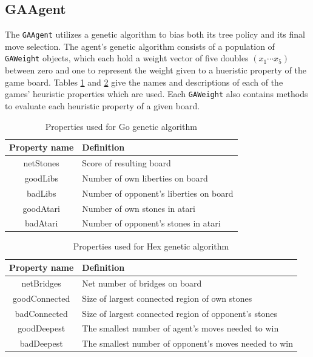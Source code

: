 \subsection{GAAgent}
The \texttt{GAAgent} utilizes a genetic algorithm to bias both its tree policy and its final move selection.  The agent's genetic algorithm consists of a population of \texttt{GAWeight} objects, which each hold a weight vector of five doubles $(x_1 \cdots x_5)$ between zero and one to represent the weight given to a hueristic property of the game board.  Tables \ref{table:go} and \ref{table:hex} give the names and descriptions of each of the games' heuristic properties which are used.  Each \texttt{GAWeight} also contains methods to evaluate each heuristic property of a given board.

\begin{table}[h]
\centering
\begin{tabular}{|c|l|}
\hline
\textbf{Property name} & \textbf{Definition}\\
\hline
\hline
netStones & Score of resulting board\\\hline
goodLibs & Number of own liberties on board\\\hline
badLibs & Number of opponent's liberties on board\\\hline
goodAtari & Number of own stones in atari\\\hline
badAtari & Number of opponent's stones in atari \\\hline
\end{tabular}
\caption{Properties used for Go genetic algorithm}
\label{table:go}
\end{table}

\begin{table}[h]
\centering
\begin{tabular}{|c|l|}
\hline
\textbf{Property name} & \textbf{Definition}\\
\hline
\hline
netBridges & Net number of bridges on board\\\hline
goodConnected & Size of largest connected region of own stones\\\hline
badConnected & Size of largest connected region of opponent's stones\\\hline
goodDeepest & The smallest number of agent's moves needed to win\\\hline
badDeepest & The smallest number of opponent's moves needed to win\\\hline
\end{tabular}
\caption{Properties used for Hex genetic algorithm}
\label{table:hex}
\end{table}

